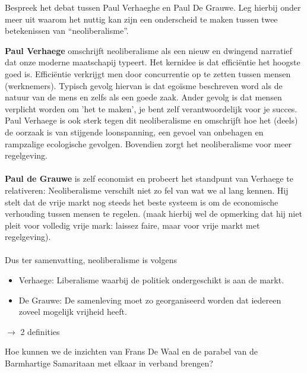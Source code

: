 \documentclass[main.tex]{subfiles}
\begin{document}
\begin{examenvraag}
    \begin{vraag}
        Bespreek het debat tussen Paul Verhaeghe en Paul De Grauwe. Leg hierbij onder meer uit waarom het nuttig kan zijn een onderscheid te maken tussen twee betekenissen van “neoliberalisme”.
    \end{vraag}

    \begin{antwoord}
	    \textbf{Paul Verhaege} omschrijft neoliberalisme als een nieuw en dwingend narratief dat onze
	    moderne maatschapij typeert. Het kernidee is dat efficiëntie het hoogste goed is. Efficiëntie
	    verkrijgt men door concurrentie op te zetten tussen mensen (werknemers). Typisch gevolg hiervan
	    is dat egoïsme beschreven word als de natuur van de mens en zelfs als een goede zaak. Ander gevolg
	    is dat mensen verplicht worden om 'het te maken', je bent zelf verantwoordelijk voor je succes.
	    Paul Verhaege is ook sterk tegen dit neoliberalisme en omschrijft hoe het (deels) de oorzaak is van
	    stijgende loonspanning, een gevoel van onbehagen en rampzalige ecologische gevolgen. Bovendien
	    zorgt
	    het neoliberalisme voor meer regelgeving.\\\\
	    \textbf{Paul de Grauwe} is zelf economist en probeert het standpunt van Verhaege te relativeren:
	    Neoliberalisme verschilt niet zo fel van wat we al lang kennen. Hij stelt dat de vrije markt
	    nog steeds het beste systeem is om de economische verhouding tussen mensen te regelen.
	    (maak hierbij wel de opmerking dat hij niet pleit voor volledig vrije mark: laissez faire, maar voor
	    vrije markt met regelgeving).\\\\
	    Dus ter samenvatting, neoliberalisme is volgens
		\begin{itemize}
			\item Verhaege: Liberalisme waarbij de politiek ondergeschikt is aan de markt.
			\item De Grauwe: De samenleving moet zo georganiseerd worden dat iedereen zoveel mogelijk vrijheid
				    heeft.
		\end{itemize}
	    
	    
	    $\rightarrow$ 2 definities
    \end{antwoord}
\end{examenvraag}


\begin{examenvraag}
    \begin{vraag}
        Hoe kunnen we de inzichten van Frans De Waal en de parabel van de Barmhartige Samaritaan met elkaar in verband brengen?
    \end{vraag}

    \begin{antwoord}
    \end{antwoord}
\end{examenvraag}
\end{document}
